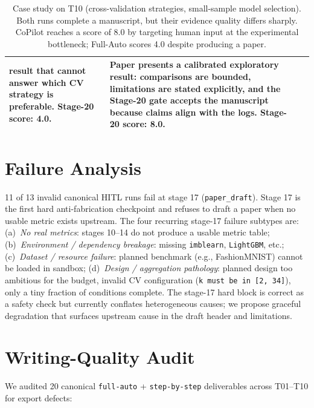 \documentclass{llmxive}
\providecommand{\eg}{e.g.,\xspace}
\begin{document}
\begin{table}[t]
\begin{tabular}{@{} l p{5.2cm} p{5.2cm} @{}}
  result that cannot answer which CV strategy is preferable.
  Stage-20 score: 4.0.
& Paper presents a calibrated exploratory result: comparisons are bounded,
  limitations are stated explicitly, and the Stage-20 gate accepts the
  manuscript because claims align with the logs. Stage-20 score: 8.0. \\
\bottomrule
\end{tabular}
\caption{Case study on T10 (cross-validation strategies, small-sample model selection). Both runs complete a manuscript, but their evidence quality
differs sharply. CoPilot reaches a score of 8.0 by targeting human input
at the experimental bottleneck; Full-Auto scores 4.0 despite producing a
paper.}
\label{tab:case_study}
\end{table}


\section{Failure Analysis}
\label{app:failures}

11 of 13 invalid canonical HITL runs fail at stage 17 (\texttt{paper\_draft}).
Stage 17 is the first hard anti-fabrication checkpoint and refuses to draft a paper
when no usable metric exists upstream. The four recurring stage-17 failure subtypes
are: (a)~\emph{No real metrics}: stages 10--14 do not produce a usable metric
table; (b)~\emph{Environment / dependency breakage}: missing \texttt{imblearn},
\texttt{LightGBM}, etc.; (c)~\emph{Dataset / resource failure}: planned benchmark
(\eg{} FashionMNIST) cannot be loaded in sandbox; (d)~\emph{Design / aggregation
pathology}: planned design too ambitious for the budget, invalid CV configuration
(\texttt{k must be in [2, 34]}), only a tiny fraction of conditions complete. The
stage-17 hard block is correct as a safety check but currently conflates
heterogeneous causes; we propose graceful degradation that surfaces upstream cause
in the draft header and limitations.


\section{Writing-Quality Audit}
\label{app:writing-quality}

We audited 20 canonical \texttt{full-auto} + \texttt{step-by-step} deliverables
across T01--T10 for export defects:
\end{document}
